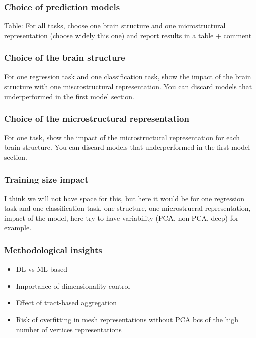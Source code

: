 \subsubsection{Choice of prediction models}
Table: 
For all tasks, choose one brain structure and one microstructural representation (choose widely this one) and report results in a table + comment

\subsubsection{Choice of the brain structure}
For one regression task and one classification task, show the impact of the brain structure with one miscrostructural representation. You can discard models that underperformed in the first model section.

\subsubsection{Choice of the microstructural representation}
For one task, show the impact of the microstructural representation for each brain structure. You can discard models that underperformed in the first model section.

\subsubsection{Training size impact} I think we will not have space for this, but here it would be for one regression task and one classification task, one structure, one microstrucral representation, impact of the model, here try to have variability (PCA, non-PCA, deep) for example.

\subsubsection{Methodological insights}
\begin{itemize}
    \item DL vs ML based
    \item Importance of dimensionality control
    \item Effect of tract-based aggregation 
    \item Risk of overfitting in mesh representations without PCA bcs of the high number of vertices representations
\end{itemize}

